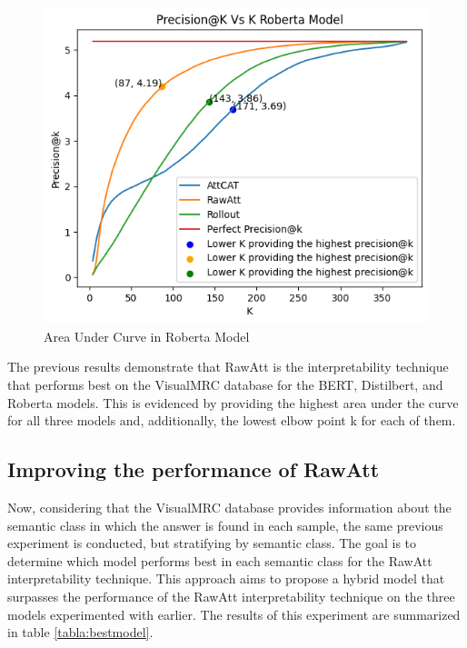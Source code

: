 \begin{figure}[h!]
    \centering%
    \includegraphics[width=0.75\linewidth]{Figures/Experimental Setup/Codo_Roberta_VMRC.png}
    \caption{Area Under Curve in Roberta Model}
    \label{fig:aucroberta}
\end{figure}


The previous results demonstrate that RawAtt is the interpretability technique that performs best on the VisualMRC database for the BERT, Distilbert, and Roberta models. This is evidenced by providing the highest area under the curve for all three models and, additionally, the lowest elbow point k for each of them.
 \newpage


\subsection{Improving the performance of RawAtt}


Now, considering that the VisualMRC database provides information about the semantic class in which the answer is found in each sample, the same previous experiment is conducted, but stratifying by semantic class. The goal is to determine which model performs best in each semantic class for the RawAtt interpretability technique. This approach aims to propose a hybrid model that surpasses the performance of the RawAtt interpretability technique on the three models experimented with earlier. The results of this experiment are summarized in table \ref{tabla:bestmodel}.

